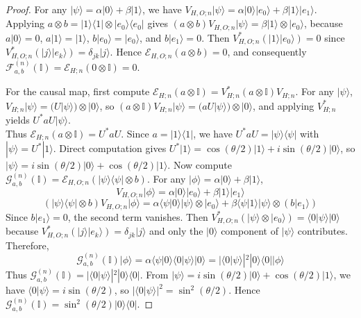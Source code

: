 \documentclass[11pt, reco]{article}
\begin{document}
\begin{proof}
For any $|\psi\rangle = \alpha|0\rangle + \beta|1\rangle$, we have $V_{H,O;n}|\psi\rangle = \alpha|0\rangle|e_0\rangle + \beta|1\rangle|e_1\rangle$. Applying $a \otimes b = |1\rangle\langle 1| \otimes |e_0\rangle\langle e_0|$ gives $(a \otimes b)V_{H,O;n}|\psi\rangle = \beta |1\rangle \otimes |e_0\rangle$, because $a|0\rangle = 0$, $a|1\rangle = |1\rangle$, $b|e_0\rangle = |e_0\rangle$, and $b|e_1\rangle = 0$. Then $V_{H,O;n}^*(|1\rangle|e_0\rangle) = 0$ since $V_{H,O;n}^*(|j\rangle|e_k\rangle) = \delta_{jk}|j\rangle$. Hence $\mathcal{E}_{H,O;n}(a \otimes b) = 0$, and consequently $\mathcal{F}^{(n)}_{a,b}(\mathbb{I}) = \mathcal{E}_{H;n}(0 \otimes \mathbb{I}) = 0$.

For the causal map, first compute $\mathcal{E}_{H;n}(a \otimes \mathbb{I}) = V_{H;n}^* (a \otimes \mathbb{I}) V_{H;n}$. For any $|\psi\rangle$, $V_{H;n}|\psi\rangle = (U|\psi\rangle) \otimes |0\rangle$, so $(a \otimes \mathbb{I})V_{H;n}|\psi\rangle = (a U|\psi\rangle) \otimes |0\rangle$, and applying $V_{H;n}^*$ yields $U^* a U |\psi\rangle$. \\
Thus $\mathcal{E}_{H;n}(a \otimes \mathbb{I}) = U^* a U$. Since $a = |1\rangle\langle 1|$, we have $U^* a U = |\psi\rangle\langle\psi|$ with $|\psi\rangle = U^*|1\rangle$. Direct computation gives $U^*|1\rangle = \cos(\theta/2)|1\rangle + i\sin(\theta/2)|0\rangle$, so $|\psi\rangle = i\sin(\theta/2)|0\rangle + \cos(\theta/2)|1\rangle$. Now compute $\mathcal{G}^{(n)}_{a,b}(\mathbb{I}) = \mathcal{E}_{H,O;n}(|\psi\rangle\langle\psi| \otimes b)$. For any $|\phi\rangle = \alpha|0\rangle + \beta|1\rangle$,
\[
V_{H,O;n}|\phi\rangle = \alpha|0\rangle|e_0\rangle + \beta|1\rangle|e_1\rangle
\]
\[
(|\psi\rangle\langle\psi| \otimes b)V_{H,O;n}|\phi\rangle = \alpha\langle\psi|0\rangle |\psi\rangle \otimes |e_0\rangle + \beta\langle\psi|1\rangle |\psi\rangle \otimes (b|e_1\rangle)
\]
Since $b|e_1\rangle = 0$, the second term vanishes. Then $V_{H,O;n}^*(|\psi\rangle \otimes |e_0\rangle) = \langle 0|\psi\rangle |0\rangle$ because $V_{H,O;n}^*(|j\rangle|e_k\rangle) = \delta_{jk}|j\rangle$ and only the $|0\rangle$ component of $|\psi\rangle$ contributes. Therefore,
\[
\mathcal{G}^{(n)}_{a,b}(\mathbb{I}) |\phi\rangle = \alpha \langle\psi|0\rangle \langle 0|\psi\rangle |0\rangle = |\langle 0|\psi\rangle|^2 |0\rangle\langle 0| |\phi\rangle
\]
Thus $\mathcal{G}^{(n)}_{a,b}(\mathbb{I}) = |\langle 0|\psi\rangle|^2 |0\rangle\langle 0|$. From $|\psi\rangle = i\sin(\theta/2)|0\rangle + \cos(\theta/2)|1\rangle$, we have $\langle 0|\psi\rangle = i\sin(\theta/2)$, so $|\langle 0|\psi\rangle|^2 = \sin^2(\theta/2)$. Hence $\mathcal{G}^{(n)}_{a,b}(\mathbb{I}) = \sin^2(\theta/2) |0\rangle\langle 0|$.
\end{proof}
\end{document}
